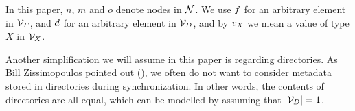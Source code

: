 In this paper, $n$, $m$ and $o$ denote nodes in $\mathcal{N}$.
We use $f$ for an arbitrary element in $\mathcal{V}_{F}$, 
and $d$ for an arbitrary element in $\mathcal{V}_{D}$,
and by $v_X$ we mean a value of type $X$ in $\mathcal{V}_{X}$.



Another simplification we will assume in this paper is regarding directories.
As Bill Zissimopoulos pointed out (\cite{BZ}), we often do not want to consider metadata stored in
directories during synchronization. In other words, the contents of directories are all equal,
which can be modelled by assuming that $|\mathcal{V}_{D}|=1$.

